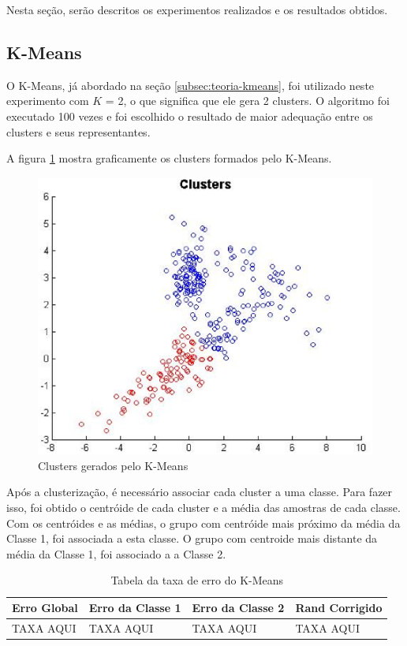 
Nesta seção, serão descritos os experimentos realizados e os resultados obtidos.

\subsection{K-Means}
\label{subsec:exp-kmeans}

O K-Means, já abordado na seção \ref{subsec:teoria-kmeans}, foi utilizado neste experimento com $K$ = 2, o que significa que ele gera 2 clusters. O algoritmo foi executado 100 vezes e foi escolhido o resultado de maior adequação entre os clusters e seus representantes.

A figura \ref{fig:clusters} mostra graficamente os clusters formados pelo K-Means.

\begin{figure}[H]
\center
\includegraphics[scale=0.60]{imagens/tecnicas/clusters.eps}
\caption{Clusters gerados pelo K-Means}
\label{fig:clusters}
\end{figure}

Após a clusterização, é necessário associar cada cluster a uma classe. Para fazer isso, foi obtido o centróide de cada cluster e a média das amostras de cada classe. Com os centróides e as médias, o grupo com centróide mais próximo da média da Classe 1, foi associada a esta classe. O grupo com centroide mais distante da média da Classe 1, foi associado a a Classe 2.


\begin{table}[H]
\begin{center}
\begin{tabular}{|l|l|l|l|}
\hline
Erro Global	&	Erro da Classe 1	&	Erro da Classe 2	&	Rand Corrigido	\\
\hline %
TAXA AQUI	&		TAXA AQUI		&		TAXA AQUI		&	TAXA AQUI		\\
\hline
\end{tabular}%
\end{center}   %
\caption{Tabela da taxa de erro do K-Means}
\label{tab:erro-kmeans}
\end{table}

